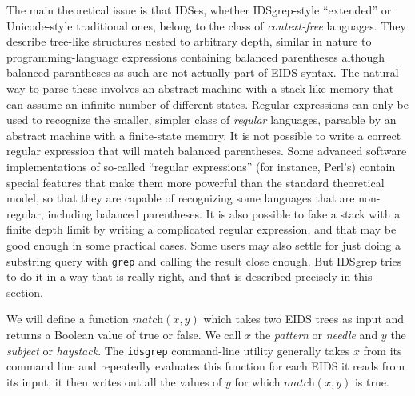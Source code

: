 \documentclass[twocolumn]{report}
\begin{document}
The main theoretical issue is that IDSes, whether IDSgrep-style ``extended''
or Unicode-style traditional ones, belong to the class of
\emph{context-free} languages.  They describe tree-like structures nested to
arbitrary depth, similar in nature to programming-language expressions
containing balanced parentheses although balanced parantheses as such are
not actually part of EIDS syntax.  The natural way to parse these involves
an abstract machine with a stack-like memory that can assume an infinite
number of different states.  Regular expressions can only be used to
recognize the smaller, simpler class of \emph{regular} languages, parsable
by an abstract machine with a finite-state memory.  It is not possible to
write a correct regular expression that will match balanced parentheses. 
Some advanced software implementations of so-called ``regular expressions''
(for instance, Perl's) contain special features that make them more powerful
than the standard theoretical model, so that they are capable of recognizing
some languages that are non-regular, including balanced parentheses.  It is
also possible to fake a stack with a finite depth limit by writing a
complicated regular expression, and that may be good enough in some
practical cases.  Some users may also settle for just doing a substring
query with \texttt{grep} and calling the result close enough.  But IDSgrep
tries to do it in a way that is really right, and that is described
precisely in this section.

We will define a function $\textit{match}(x,y)$ which takes two EIDS trees
as input and returns a Boolean value of true or false.  We
call $x$ the \emph{pattern} or \emph{needle} and $y$ the \emph{subject} or
\emph{haystack}.  The \texttt{idsgrep} command-line utility generally takes
$x$ from its command line and repeatedly evaluates this function for each
EIDS it reads from its input; it then writes out all the values of $y$ for
which $\textit{match}(x,y)$ is true.
\end{document}
